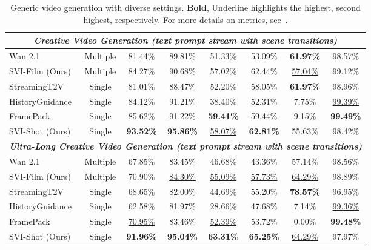 \documentclass{article} %
\newcommand{\highlight}[1]{\textbf{\emph{#1}}}
\newcommand{\best}[1]{{\textbf{#1}}}
\newcommand{\secondbest}[1]{{\underline{#1}}}
\begin{document}
\begin{table}[t]
\begin{tabular}{l|c|c|c|c|c|c|c}
\hline
\multicolumn{8}{c}{{\highlight{Creative Video Generation (text prompt stream with scene transitions)}}} \\
\hline
Wan 2.1 & Multiple & 81.44\% & 89.81\% & 51.33\% & 53.09\% & \best{61.97\%} & 98.57\% \\
\rowcolor{blue!10} SVI-Film (Ours) & Multiple & 84.27\% & 90.68\% & 57.02\% & 62.44\% & \secondbest{57.04\%} & 99.12\% \\ \hline
StreamingT2V & Single & 81.01\% & 88.47\% & 52.20\% & 58.05\% & \best{61.97\%} & 98.96\% \\ 
HistoryGuidance & Single & 84.12\% & 91.21\% & 38.40\% & 52.31\% & 7.75\% & \secondbest{99.39\%} \\ 
FramePack &Single & \secondbest{85.62\%} & \secondbest{91.22\%} & \textbf{59.41\%} & \secondbest{59.44\%} & 9.15\% & \textbf{99.49\%} \\ 
\rowcolor{blue!10} SVI-Shot (Ours) & Single & \textbf{93.52\%} & \textbf{95.86\%} & \secondbest{58.07\%} & \textbf{62.81\%} & 55.63\% & 98.42\% \\ 
\hline
\multicolumn{8}{c}{{\highlight{Ultra-Long Creative Video Generation (text prompt stream with scene transitions)}}} \\
\hline
Wan 2.1 & Multiple & 67.85\% & 83.45\% & 46.68\% & 43.36\% & 57.14\% & 98.56\% \\ 
\rowcolor{blue!10} SVI-Film (Ours) &Multiple & 70.90\% & \secondbest{84.30\%} & \secondbest{55.09\%} & \secondbest{57.73\%} & \secondbest{64.29\%} & 98.89\% \\ \hline
StreamingT2V & Single & 68.65\% & 82.00\% & 44.69\% & 55.20\% & \textbf{78.57\%} & 96.95\% \\ 
HistoryGuidance & Single & 62.58\% & 81.97\% & 28.66\% & 47.68\% & 7.14\% & \secondbest{99.36\%} \\ 
FramePack & Single & \secondbest{70.95\%} & 83.46\% & \secondbest{52.39\%} & 53.72\% & 0.00\% & \textbf{99.48\%} \\ 
\rowcolor{blue!10} SVI-Shot (Ours) & Single & \textbf{91.96\%} & \textbf{95.04\%} & \textbf{63.31\%} & \textbf{65.25\%} & \secondbest{64.29\%} & 97.97\% \\ 
\hline
\end{tabular}
\vspace{-6pt}
\caption{Generic video generation with diverse settings. \textbf{Bold}, \secondbest{Underline} highlights the highest, second highest, respectively. For more details on metrics, see~\citep{huang2024vbench}.}
\label{tab:main_results}
\vspace{-5pt}
\end{table}
\end{document}
